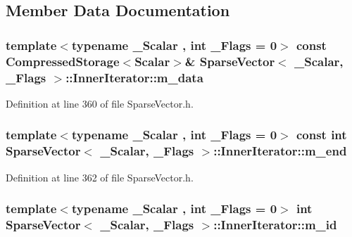 \subsection{Member Data Documentation}
\hypertarget{class_sparse_vector_1_1_inner_iterator_aab2fed2e951be1ba598e3c6adf93ea07}{
\subsubsection[{m\-\_\-data}]{\setlength{\rightskip}{0pt plus 5cm}template$<$typename \-\_\-\-Scalar , int \-\_\-\-Flags = 0$>$ const {\bf Compressed\-Storage}$<${\bf Scalar}$>$\& {\bf Sparse\-Vector}$<$ \-\_\-\-Scalar, \-\_\-\-Flags $>$\-::Inner\-Iterator\-::m\-\_\-data\hspace{0.3cm}{\ttfamily [protected]}}}\label{class_sparse_vector_1_1_inner_iterator_aab2fed2e951be1ba598e3c6adf93ea07}


Definition at line 360 of file Sparse\-Vector.\-h.

\hypertarget{class_sparse_vector_1_1_inner_iterator_a8106b3122bf166cacfdf07ed1f70cc20}{
\subsubsection[{m\-\_\-end}]{\setlength{\rightskip}{0pt plus 5cm}template$<$typename \-\_\-\-Scalar , int \-\_\-\-Flags = 0$>$ const {\bf int} {\bf Sparse\-Vector}$<$ \-\_\-\-Scalar, \-\_\-\-Flags $>$\-::Inner\-Iterator\-::m\-\_\-end\hspace{0.3cm}{\ttfamily [protected]}}}\label{class_sparse_vector_1_1_inner_iterator_a8106b3122bf166cacfdf07ed1f70cc20}


Definition at line 362 of file Sparse\-Vector.\-h.

\hypertarget{class_sparse_vector_1_1_inner_iterator_aa1148870e3a923b8d6a96410881e2c83}{
\subsubsection[{m\-\_\-id}]{\setlength{\rightskip}{0pt plus 5cm}template$<$typename \-\_\-\-Scalar , int \-\_\-\-Flags = 0$>$ {\bf int} {\bf Sparse\-Vector}$<$ \-\_\-\-Scalar, \-\_\-\-Flags $>$\-::Inner\-Iterator\-::m\-\_\-id\hspace{0.3cm}{\ttfamily [protected]}}}\label{class_sparse_vector_1_1_inner_iterator_aa1148870e3a923b8d6a96410881e2c83}


